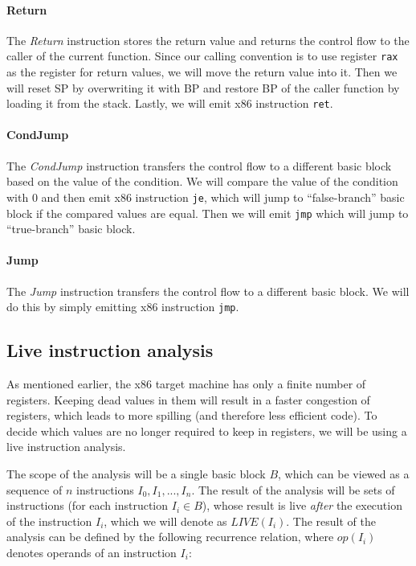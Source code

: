 \documentclass[thesis=M,english]{FITthesis}[2019/12/23]
\begin{document}
\paragraph*{Return} The \emph{Return} instruction stores the return value and returns the control flow to the caller of the current function. Since our calling convention is to use register \texttt{rax} as the register for return values, we will move the return value into it. Then we will reset SP by overwriting it with BP and restore BP of the caller function by loading it from the stack. Lastly, we will emit x86 instruction \texttt{ret}.

\paragraph*{CondJump} The \emph{CondJump} instruction transfers the control flow to a different basic block based on the value of the condition. We will compare the value of the condition with $0$ and then emit x86 instruction \texttt{je}, which will jump to “false-branch” basic block if the compared values are equal. Then we will emit \texttt{jmp} which will jump to “true-branch” basic block.

\paragraph*{Jump} The \emph{Jump} instruction transfers the control flow to a different basic block. We will do this by simply emitting x86 instruction \texttt{jmp}.

\subsection{Live instruction analysis}\label{ssec:lia}
As mentioned earlier, the x86 target machine has only a finite number of registers. Keeping dead values in them will result in a faster congestion of registers, which leads to more spilling (and therefore less efficient code). To decide which values are no longer required to keep in registers, we will be using a live instruction analysis.

The scope of the analysis will be a single basic block $B$, which can be viewed as a sequence of $n$ instructions $I_0, I_1, ..., I_n$. The result of the analysis will be sets of instructions (for each instruction $I_i \in B$), whose result is live \emph{after} the execution of the instruction $I_i$, which we will denote as $LIVE(I_i)$. The result of the analysis can be defined by the following recurrence relation, where $op(I_i)$ denotes operands of an instruction $I_i$:
\end{document}

